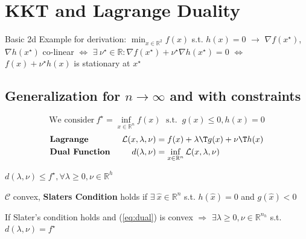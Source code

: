 \section{KKT and Lagrange Duality}

Basic 2d Example for derivation:
$\min _{x \in \mathbb{R}^2} f(x)$ s.t. $h(x)=0$
$\rightarrow$
$\nabla f(x^\star)$, $\nabla h(x^\star)$
co-linear
$\Leftrightarrow$
$\exists\ \nu^\star \in \mathbb{R}: \nabla f(x^\star)+\nu^\star\nabla h(x^\star) = 0$
$\Leftrightarrow$
$f(x)+\nu^\star h(x)$ is stationary at $x^\star$

\subsection{Generalization for $n\rightarrow\infty$ and with constraints}
\vspace{-5mm}
\begin{equation}
	\text{We consider}\
	f^\star = \inf_{x\in\mathcal{\mathbb{R}}^n}f(x)
	\;\text{ s.t. }\ g(x)\le0,h(x)=0
	\label{eq:dual}
\end{equation}
\vspace{-3mm}
$$\begin{aligned}
		                           & \textbf{Lagrange }                                              &
		\mathcal{L}(x,\lambda,\nu) & = f(x) + \lambda\T g(x)+\nu\T h(x)
		\\
		                           & \textbf{Dual Function }                                         &
		d(\lambda,\nu)             & = \inf_{x \in \mathcal{\mathbb{R}}^n}\mathcal{L}(x,\lambda,\nu)
	\end{aligned}$$
\vspace{-2mm}
\begin{proposition}
	$d(\lambda,\nu)\le f^\star,\forall\lambda\ge0,\nu\in\mathbb{R}^{h}$
\end{proposition}

\begin{definition}
	$\mathcal{C}$ convex, \textbf{Slaters Condition} holds if
	$\exists\ \hat{x} \in \mathbb{R}^{n}$ s.t. $h(\hat{x})=0$ and $g(\hat{x})<0$
\end{definition}

\begin{proposition}
	If Slater's condition holds
	and (\ref{eq:dual}) is convex
	$\Rightarrow$
	$\exists \lambda \ge 0, \nu \in \mathbb{R}^{n_h}$ s.t. $d(\lambda,\nu)=f^\star$
\end{proposition}

